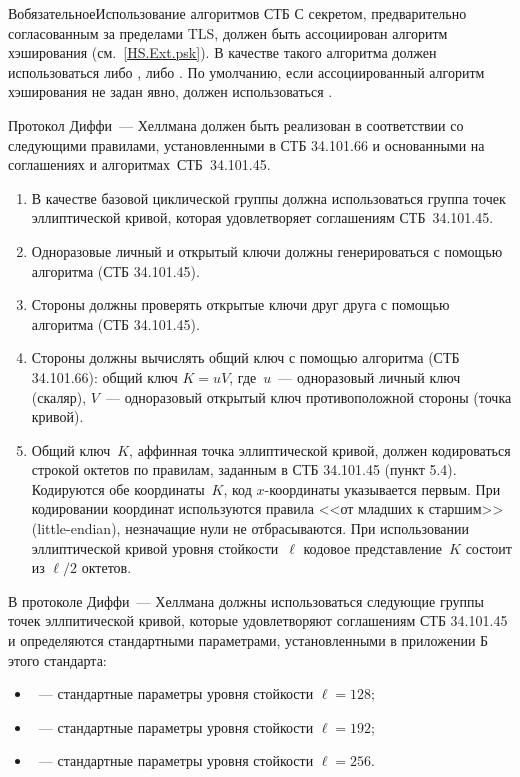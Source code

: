 \begin{appendix}{В}{обязательное}{Использование алгоритмов СТБ}
С секретом, предварительно согласованным за пределами TLS, должен быть 
ассоциирован алгоритм хэширования (см.~\ref{HS.Ext.psk}). В качестве такого 
алгоритма должен использоваться либо , либо .
%
По умолчанию, если ассоциированный алгоритм хэширования не задан явно, должен 
использоваться .

\label{BSUITES.DH}

Протокол Диффи~--- Хеллмана должен быть реализован в соответствии со следующими 
правилами, установленными в СТБ 34.101.66 и основанными на соглашениях и 
алгоритмах~СТБ~34.101.45.

\begin{enumerate}
\item
В качестве базовой циклической группы должна использоваться группа точек 
эллиптической кривой, которая удовлетворяет соглашениям СТБ~34.101.45.

\item
Одноразовые личный и открытый ключи должны генерироваться с помощью алгоритма
 (СТБ 34.101.45).

\item
Стороны должны проверять открытые ключи друг друга с помощью алгоритма
 (СТБ 34.101.45).

\item
Стороны должны вычислять общий ключ с помощью алгоритма  (СТБ
34.101.66): общий ключ $K=uV$, где~$u$~--- одноразовый личный ключ (скаляр),
$V$~--- одноразовый открытый ключ противоположной стороны (точка кривой).

\item
Общий ключ~$K$, аффинная точка эллиптической кривой, должен кодироваться строкой
октетов по правилам, заданным в СТБ 34.101.45 (пункт 5.4). Кодируются обе
координаты~$K$, код $x$-координаты указывается первым. При кодировании координат
используются правила <<от младших к старшим>> (little-endian), незначащие нули
не отбрасываются. При использовании эллиптической кривой уровня стойкости~$\ell$
кодовое представление~$K$ состоит из $\ell/2$ октетов.
\end{enumerate}

\label{BSUITES.Groups}

В протоколе Диффи~--- Хеллмана должны использоваться следующие группы точек 
эллпитической кривой, которые удовлетворяют соглашениям СТБ 34.101.45 и 
определяются стандартными параметрами, установленными в приложении Б этого 
стандарта:
\begin{itemize}
\item
{}~--- стандартные параметры уровня стойкости $\ell=128$;
\item
{}~--- стандартные параметры уровня стойкости $\ell=192$;
\item
{}~--- стандартные параметры уровня стойкости $\ell=256$.
\end{itemize}


\end{appendix}
